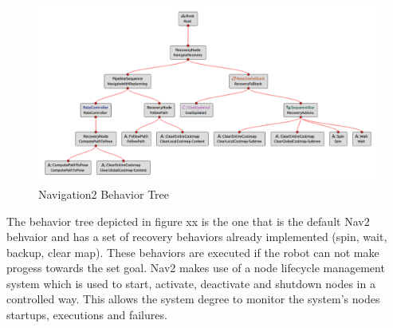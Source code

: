 \begin{figure} [h!]
	\includegraphics[width=1.0\textwidth]{images/nav_bt-modified.png}
	\caption{Navigation2 Behavior Tree}
\end{figure}

The behavior tree depicted in figure xx is the one that is the default Nav2 behvaior and has a set of recovery behaviors already implemented (spin, wait, backup, clear map). These behaviors are executed if the robot can not make progess towards the set goal. 
Nav2 makes use of a node lifecycle management system which is used to start, activate, deactivate and shutdown nodes in a controlled way. This allows the system degree to monitor the system's nodes startups, executions and failures. 

